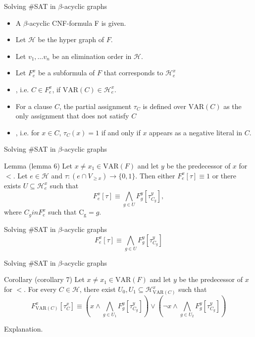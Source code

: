\begin{frame}[t]{Solving \#SAT in $\beta$-acyclic graphs}
	\begin{itemize}[<+->]
	\item A $\beta$-acyclic CNF-formula F is given.
	\item Let $\mathcal{H}$ be the hyper graph of $F$.
	\item Let $v_1, \dots v_n$ be an elimination order in $\mathcal{H}$.
	\item Let {\color{blue}$F^x_e$} be a subformula of $F$ that corresponds to $\mathcal{H}^x_e$
	\item[]\hspace{1cm}, i.e. $C \in F^x_e$, if $\mathrm{VAR}(C) \in \mathcal{H}^x_e$.
	\item For a clause $C$, the partial assignment {\color{blue}$\tau_C$} is defined over $\mathrm{VAR}(C)$ as the only assignment that does not satisfy $C$
	\item[]\hspace{1cm}, i.e. for $x \in C$, $\tau_C(x) = 1$ if and only if $x$ appears as a negative literal in $C$.
	\end{itemize}
\end{frame}
\begin{frame}[t]{Solving \#SAT in $\beta$-acyclic graphs}
	\begin{block}{Lemma (lemma 6)}
		Let $x \neq x_1 \in \mathrm{VAR}(F)$ and let $y$ be the predecessor of $x$ for $<$.  Let $e \in \mathcal{H}$ and $\tau : (e \cap V_{\geq x}) \rightarrow \{0, 1\}$. Then either $F^x_e[\tau] \equiv 1$ or there exists $U \subseteq \mathcal{H}^x_e$ such that 
		$$ F^x_e[\tau] \equiv \bigwedge\limits_{g \in U} F^y_g[\tau^y_{C_g}],$$
		where $C_g in F^x_e$ such that $\mathrm{C_g} = g$.
	\end{block}
\end{frame}

\begin{frame}[t]{Solving \#SAT in $\beta$-acyclic graphs}
		$$ F^x_e[\tau] \equiv \bigwedge\limits_{g \in U} F^y_g[\tau^y_{C_g}]$$
\end{frame}

\begin{frame}[t]{Solving \#SAT in $\beta$-acyclic graphs}
	\begin{block}{Corollary (corollary 7)}
		Let $x \neq x_1 \in \mathrm{VAR}(F)$ and let $y$ be the predecessor of $x$ for $<$. For every $C \in \mathcal{H}$, there exist $U_0, U_1 \subseteq \mathcal{H}^x_{\mathrm{VAR}(C)}$ such that
		$$F^x_{\mathrm{VAR}(C)}[\tau^x_C] \equiv 
		( x \land \bigwedge\limits_{g \in U_1} F^y_g[\tau^y_{C_g}]) \lor
		( \lnot x \land \bigwedge\limits_{g \in U_2} F^y_g[\tau^y_{C_g}])
		$$
	\end{block}
	Explanation.
\end{frame}

